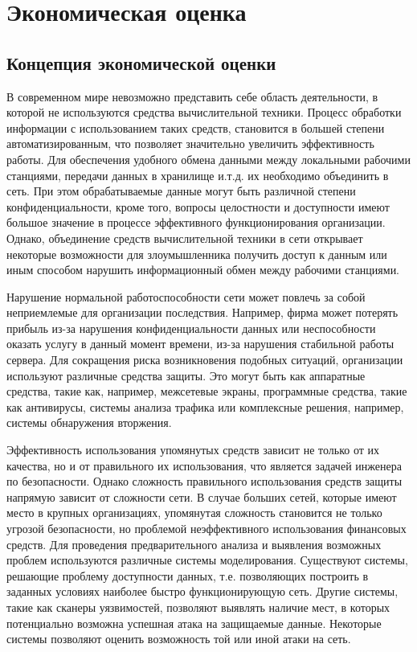 
\newpage

\chapter{Экономическая оценка}
\section{Концепция экономической оценки}


В современном мире невозможно представить себе область деятельности, в которой не используются средства вычислительной техники. Процесс обработки информации с использованием таких средств, становится в большей степени автоматизированным, что позволяет значительно увеличить эффективность работы. Для обеспечения удобного обмена данными между локальными рабочими станциями, передачи данных в хранилище и.т.д. их необходимо объединить в сеть.  При этом обрабатываемые данные могут быть различной степени конфиденциальности, кроме того, вопросы целостности и доступности имеют большое значение в процессе эффективного функционирования организации. Однако, объединение средств вычислительной техники в сети открывает некоторые возможности для злоумышленника получить доступ к данным или  иным способом нарушить информационный обмен между рабочими станциями.

Нарушение нормальной работоспособности сети может повлечь за собой неприемлемые для организации последствия. Например, фирма может потерять прибыль из-за нарушения конфиденциальности данных или неспособности оказать услугу в данный момент времени, из-за нарушения стабильной работы сервера.
Для сокращения риска возникновения подобных ситуаций, организации используют различные средства защиты. Это могут быть как аппаратные средства, такие как, например,  межсетевые экраны, программные средства, такие как антивирусы, системы анализа трафика или комплексные решения, например, системы обнаружения вторжения.

Эффективность использования упомянутых средств зависит не только от их качества, но и от правильного их использования, что является задачей инженера по безопасности. Однако сложность правильного использования средств защиты напрямую зависит от сложности сети. В случае больших сетей, которые имеют место в крупных организациях, упомянутая сложность становится не только угрозой безопасности, но проблемой неэффективного использования финансовых средств.
Для проведения предварительного анализа и выявления возможных проблем используются различные системы моделирования. Существуют системы, решающие проблему доступности данных, т.е. позволяющих построить в заданных условиях наиболее быстро функционирующую сеть. Другие системы, такие как сканеры уязвимостей, позволяют выявлять наличие мест, в которых потенциально возможна успешная атака на защищаемые данные. Некоторые системы позволяют оценить возможность той или иной атаки на сеть.

